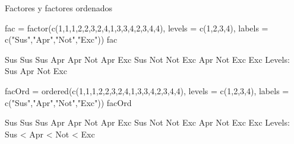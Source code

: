 \documentclass[
  ignorenonframetext,
  aspectratio=169]{beamer}
\newenvironment{Shaded}{\begin{snugshade}}{\end{snugshade}}
\newcommand{\AttributeTok}[1]{\textcolor[rgb]{0.77,0.63,0.00}{#1}}
\newcommand{\DecValTok}[1]{\textcolor[rgb]{0.00,0.00,0.81}{#1}}
\newcommand{\FunctionTok}[1]{\textcolor[rgb]{0.00,0.00,0.00}{#1}}
\newcommand{\NormalTok}[1]{#1}
\newcommand{\OtherTok}[1]{\textcolor[rgb]{0.56,0.35,0.01}{#1}}
\newcommand{\StringTok}[1]{\textcolor[rgb]{0.31,0.60,0.02}{#1}}
\let\oldverbatim\verbatim
\let\endoldverbatim\endverbatim
\renewenvironment{verbatim}{\tiny\oldverbatim}{\endoldverbatim}
\begin{document}
\begin{frame}[fragile]{Factores y factores ordenados}
\protect\hypertarget{factores-y-factores-ordenados}{}
\begin{Shaded}
\begin{Highlighting}[]
\NormalTok{fac }\OtherTok{=} \FunctionTok{factor}\NormalTok{(}\FunctionTok{c}\NormalTok{(}\DecValTok{1}\NormalTok{,}\DecValTok{1}\NormalTok{,}\DecValTok{1}\NormalTok{,}\DecValTok{2}\NormalTok{,}\DecValTok{2}\NormalTok{,}\DecValTok{3}\NormalTok{,}\DecValTok{2}\NormalTok{,}\DecValTok{4}\NormalTok{,}\DecValTok{1}\NormalTok{,}\DecValTok{3}\NormalTok{,}\DecValTok{3}\NormalTok{,}\DecValTok{4}\NormalTok{,}\DecValTok{2}\NormalTok{,}\DecValTok{3}\NormalTok{,}\DecValTok{4}\NormalTok{,}\DecValTok{4}\NormalTok{), }
       \AttributeTok{levels =} \FunctionTok{c}\NormalTok{(}\DecValTok{1}\NormalTok{,}\DecValTok{2}\NormalTok{,}\DecValTok{3}\NormalTok{,}\DecValTok{4}\NormalTok{), }
       \AttributeTok{labels =} \FunctionTok{c}\NormalTok{(}\StringTok{"Sus"}\NormalTok{,}\StringTok{"Apr"}\NormalTok{,}\StringTok{"Not"}\NormalTok{,}\StringTok{"Exc"}\NormalTok{))}
\NormalTok{fac}
\end{Highlighting}
\end{Shaded}

\begin{verbatim}
 [1] Sus Sus Sus Apr Apr Not Apr Exc Sus Not Not Exc Apr Not Exc Exc
Levels: Sus Apr Not Exc
\end{verbatim}

\begin{Shaded}
\begin{Highlighting}[]
\NormalTok{facOrd }\OtherTok{=} \FunctionTok{ordered}\NormalTok{(}\FunctionTok{c}\NormalTok{(}\DecValTok{1}\NormalTok{,}\DecValTok{1}\NormalTok{,}\DecValTok{1}\NormalTok{,}\DecValTok{2}\NormalTok{,}\DecValTok{2}\NormalTok{,}\DecValTok{3}\NormalTok{,}\DecValTok{2}\NormalTok{,}\DecValTok{4}\NormalTok{,}\DecValTok{1}\NormalTok{,}\DecValTok{3}\NormalTok{,}\DecValTok{3}\NormalTok{,}\DecValTok{4}\NormalTok{,}\DecValTok{2}\NormalTok{,}\DecValTok{3}\NormalTok{,}\DecValTok{4}\NormalTok{,}\DecValTok{4}\NormalTok{), }
       \AttributeTok{levels =} \FunctionTok{c}\NormalTok{(}\DecValTok{1}\NormalTok{,}\DecValTok{2}\NormalTok{,}\DecValTok{3}\NormalTok{,}\DecValTok{4}\NormalTok{), }
       \AttributeTok{labels =} \FunctionTok{c}\NormalTok{(}\StringTok{"Sus"}\NormalTok{,}\StringTok{"Apr"}\NormalTok{,}\StringTok{"Not"}\NormalTok{,}\StringTok{"Exc"}\NormalTok{))}
\NormalTok{facOrd}
\end{Highlighting}
\end{Shaded}

\begin{verbatim}
 [1] Sus Sus Sus Apr Apr Not Apr Exc Sus Not Not Exc Apr Not Exc Exc
Levels: Sus < Apr < Not < Exc
\end{verbatim}
\end{frame}
\end{document}
